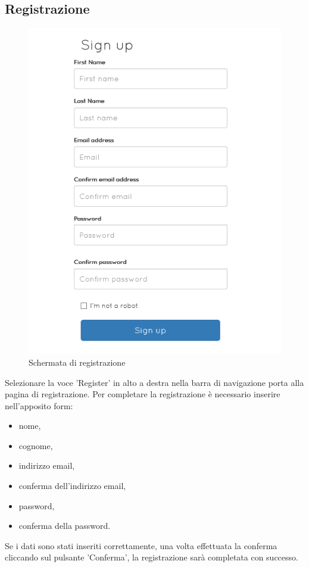\documentclass[a4paper, titlepage]{article}
\begin{document}
	\subsection{Registrazione}
	\begin{figure}[!ht]
		\centering
		\includegraphics[scale=1]{Img/register.png}
		\caption{Schermata di registrazione}
	\end{figure}
	Selezionare la voce 'Register' in alto a destra nella barra di navigazione porta alla pagina di registrazione.
	Per completare la registrazione è necessario inserire nell'apposito form:
	\begin{itemize}
		\item nome,
		\item cognome,
		\item indirizzo email,
		\item conferma dell'indirizzo email,
		\item password,
		\item conferma della password.
	\end{itemize}
	Se i dati sono stati inseriti correttamente, una volta effettuata la conferma cliccando sul pulsante 'Conferma', la registrazione sarà completata con successo.
\end{document}
